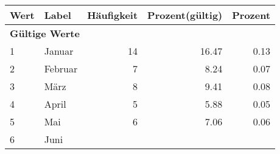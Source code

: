      \begin{longtable}{lXrrr}
     \toprule
     \textbf{Wert} & \textbf{Label} & \textbf{Häufigkeit} & \textbf{Prozent(gültig)} & \textbf{Prozent} \\
     \endhead
     \midrule
     \multicolumn{5}{l}{\textbf{Gültige Werte}}\\

     1 &
     \multicolumn{1}{X}{ Januar   } &


       \num{14} &
       \num[round-mode=places,round-precision=2]{16.47} &
         \num[round-mode=places,round-precision=2]{0.13} \\

     2 &
     \multicolumn{1}{X}{ Februar   } &


       \num{7} &
       \num[round-mode=places,round-precision=2]{8.24} &
         \num[round-mode=places,round-precision=2]{0.07} \\

     3 &
     \multicolumn{1}{X}{ März   } &


       \num{8} &
       \num[round-mode=places,round-precision=2]{9.41} &
         \num[round-mode=places,round-precision=2]{0.08} \\

     4 &
     \multicolumn{1}{X}{ April   } &


       \num{5} &
       \num[round-mode=places,round-precision=2]{5.88} &
         \num[round-mode=places,round-precision=2]{0.05} \\

     5 &
     \multicolumn{1}{X}{ Mai   } &


       \num{6} &
       \num[round-mode=places,round-precision=2]{7.06} &
         \num[round-mode=places,round-precision=2]{0.06} \\

     6 &
     \multicolumn{1}{X}{ Juni   } &



\end{longtable}
